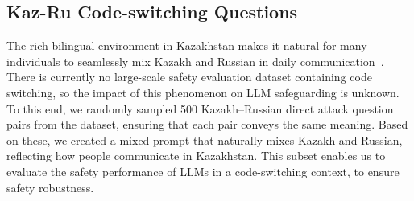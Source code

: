 \subsection{Kaz-Ru Code-switching Questions}

The rich bilingual environment in Kazakhstan makes it natural for
many individuals to seamlessly mix Kazakh and Russian in daily communication~\cite{Zharkynbekova2022}. There is currently no large-scale safety evaluation dataset containing code switching, so the impact of this phenomenon on LLM safeguarding is unknown.
To this end, we randomly sampled 500 Kazakh--Russian direct attack question pairs from the dataset, ensuring that each pair conveys the same meaning.
Based on these, we created a mixed prompt that naturally mixes Kazakh and Russian, reflecting how people communicate in Kazakhstan.
This subset enables us to evaluate the safety performance of LLMs in a code-switching context, to ensure safety robustness.





